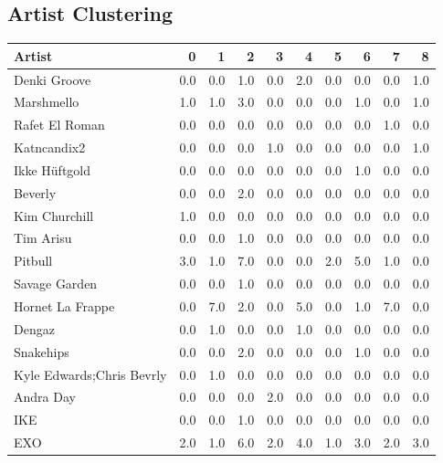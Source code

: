 \begin{appendix}
\section{Artist Clustering}
\label{appendix:E}
\begin{table}[h]
\centering
\begin{tabular}{|l|r|r|r|r|r|r|r|r|r|}
\toprule
{Artist} &    0 &    1 &    2 &    3 &    4 &    5 &    6 &    7 &    8 \\
\midrule
Denki Groove              &  0.0 &  0.0 &  1.0 &  0.0 &  2.0 &  0.0 &  0.0 &  0.0 &  1.0 \\
Marshmello                &  1.0 &  1.0 &  3.0 &  0.0 &  0.0 &  0.0 &  1.0 &  0.0 &  1.0 \\
Rafet El Roman            &  0.0 &  0.0 &  0.0 &  0.0 &  0.0 &  0.0 &  0.0 &  1.0 &  0.0 \\
Katncandix2               &  0.0 &  0.0 &  0.0 &  1.0 &  0.0 &  0.0 &  0.0 &  0.0 &  1.0 \\
Ikke Hüftgold             &  0.0 &  0.0 &  0.0 &  0.0 &  0.0 &  0.0 &  1.0 &  0.0 &  0.0 \\
Beverly                   &  0.0 &  0.0 &  2.0 &  0.0 &  0.0 &  0.0 &  0.0 &  0.0 &  0.0 \\
Kim Churchill             &  1.0 &  0.0 &  0.0 &  0.0 &  0.0 &  0.0 &  0.0 &  0.0 &  0.0 \\
Tim Arisu                 &  0.0 &  0.0 &  1.0 &  0.0 &  0.0 &  0.0 &  0.0 &  0.0 &  0.0 \\
Pitbull                   &  3.0 &  1.0 &  7.0 &  0.0 &  0.0 &  2.0 &  5.0 &  1.0 &  0.0 \\
Savage Garden             &  0.0 &  0.0 &  1.0 &  0.0 &  0.0 &  0.0 &  0.0 &  0.0 &  0.0 \\
Hornet La Frappe          &  0.0 &  7.0 &  2.0 &  0.0 &  5.0 &  0.0 &  1.0 &  7.0 &  0.0 \\
Dengaz                    &  0.0 &  1.0 &  0.0 &  0.0 &  1.0 &  0.0 &  0.0 &  0.0 &  0.0 \\
Snakehips                 &  0.0 &  0.0 &  2.0 &  0.0 &  0.0 &  0.0 &  1.0 &  0.0 &  0.0 \\
Kyle Edwards;Chris Bevrly &  0.0 &  1.0 &  0.0 &  0.0 &  0.0 &  0.0 &  0.0 &  0.0 &  0.0 \\
Andra Day                 &  0.0 &  0.0 &  0.0 &  2.0 &  0.0 &  0.0 &  0.0 &  0.0 &  0.0 \\
IKE                       &  0.0 &  0.0 &  1.0 &  0.0 &  0.0 &  0.0 &  0.0 &  0.0 &  0.0 \\
EXO                   &  2.0 &  1.0 &   6.0 &  2.0 &  4.0 &   1.0 &  3.0 &  2.0 &  3.0 \\

\end{tabular}
\end{table}
\end{appendix}
